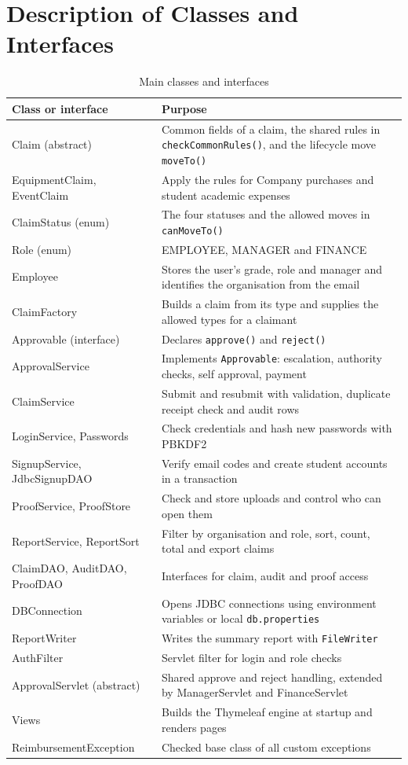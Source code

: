 \documentclass[12pt,a4paper]{report}
\begin{document}
\section{Description of Classes and Interfaces}

\begin{table}[H]
\centering
\small
\begin{tabularx}{\linewidth}{>{\raggedright\arraybackslash\ttfamily}p{5.0cm} Y}
\toprule
\normalfont\bfseries Class or interface & \bfseries Purpose\\
\midrule
Claim (abstract) & Common fields of a claim, the shared rules in \texttt{checkCommonRules()}, and the lifecycle move \texttt{moveTo()}\\
EquipmentClaim, EventClaim & Apply the rules for Company purchases and student academic expenses\\
ClaimStatus (enum) & The four statuses and the allowed moves in \texttt{canMoveTo()}\\
Role (enum) & EMPLOYEE, MANAGER and FINANCE\\
Employee & Stores the user's grade, role and manager and identifies the organisation from the email\\
ClaimFactory & Builds a claim from its type and supplies the allowed types for a claimant\\
Approvable (interface) & Declares \texttt{approve()} and \texttt{reject()}\\
ApprovalService & Implements \texttt{Approvable}: escalation, authority checks, self approval, payment\\
ClaimService & Submit and resubmit with validation, duplicate receipt check and audit rows\\
LoginService, Passwords & Check credentials and hash new passwords with PBKDF2\\
SignupService, JdbcSignupDAO & Verify email codes and create student accounts in a transaction\\
ProofService, ProofStore & Check and store uploads and control who can open them\\
ReportService, ReportSort & Filter by organisation and role, sort, count, total and export claims\\
ClaimDAO, AuditDAO, ProofDAO & Interfaces for claim, audit and proof access\\
DBConnection & Opens JDBC connections using environment variables or local \texttt{db.properties}\\
ReportWriter & Writes the summary report with \texttt{FileWriter}\\
AuthFilter & Servlet filter for login and role checks\\
ApprovalServlet (abstract) & Shared approve and reject handling, extended by ManagerServlet and FinanceServlet\\
Views & Builds the Thymeleaf engine at startup and renders pages\\
ReimbursementException & Checked base class of all custom exceptions\\
\bottomrule
\end{tabularx}
\caption{Main classes and interfaces}
\end{table}
\end{document}
